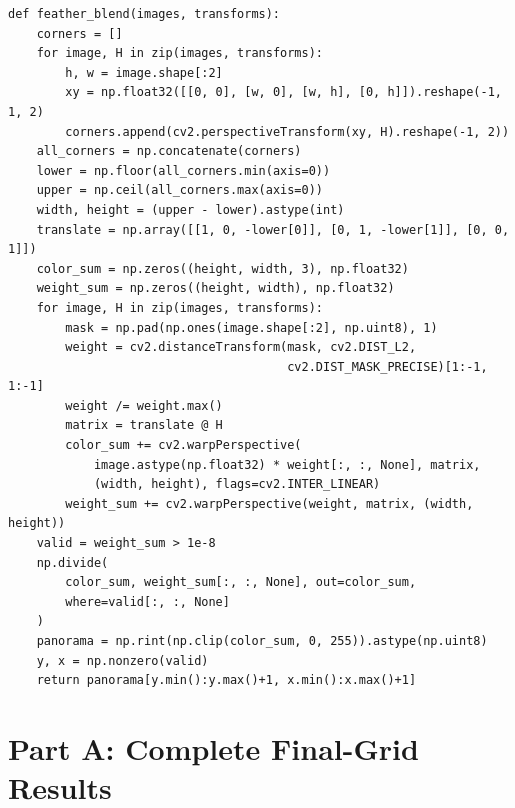 \documentclass[a4paper,12pt]{article}
\begin{document}
\begin{lstlisting}
def feather_blend(images, transforms):
    corners = []
    for image, H in zip(images, transforms):
        h, w = image.shape[:2]
        xy = np.float32([[0, 0], [w, 0], [w, h], [0, h]]).reshape(-1, 1, 2)
        corners.append(cv2.perspectiveTransform(xy, H).reshape(-1, 2))
    all_corners = np.concatenate(corners)
    lower = np.floor(all_corners.min(axis=0))
    upper = np.ceil(all_corners.max(axis=0))
    width, height = (upper - lower).astype(int)
    translate = np.array([[1, 0, -lower[0]], [0, 1, -lower[1]], [0, 0, 1]])
    color_sum = np.zeros((height, width, 3), np.float32)
    weight_sum = np.zeros((height, width), np.float32)
    for image, H in zip(images, transforms):
        mask = np.pad(np.ones(image.shape[:2], np.uint8), 1)
        weight = cv2.distanceTransform(mask, cv2.DIST_L2,
                                       cv2.DIST_MASK_PRECISE)[1:-1, 1:-1]
        weight /= weight.max()
        matrix = translate @ H
        color_sum += cv2.warpPerspective(
            image.astype(np.float32) * weight[:, :, None], matrix,
            (width, height), flags=cv2.INTER_LINEAR)
        weight_sum += cv2.warpPerspective(weight, matrix, (width, height))
    valid = weight_sum > 1e-8
    np.divide(
        color_sum, weight_sum[:, :, None], out=color_sum,
        where=valid[:, :, None]
    )
    panorama = np.rint(np.clip(color_sum, 0, 255)).astype(np.uint8)
    y, x = np.nonzero(valid)
    return panorama[y.min():y.max()+1, x.min():x.max()+1]
\end{lstlisting}
\clearpage
\section{Part A: Complete Final-Grid Results}
\label{app:a-full}

\end{document}
